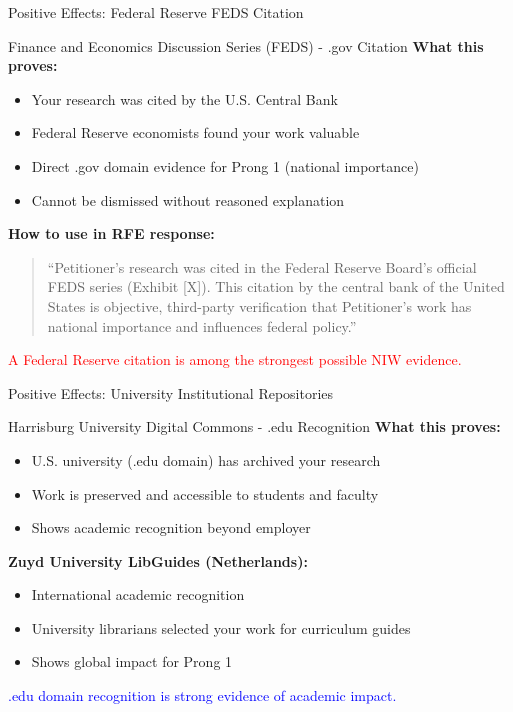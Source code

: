 \documentclass[11pt]{beamer}
\begin{document}
	\begin{frame}{Positive Effects: Federal Reserve FEDS Citation}
		\scriptsize
		\begin{block}{Finance and Economics Discussion Series (FEDS) - .gov Citation}
			\textbf{What this proves:}
			\begin{itemize}
				\item Your research was cited by the U.S. Central Bank
				\item Federal Reserve economists found your work valuable
				\item Direct .gov domain evidence for Prong 1 (national importance)
				\item Cannot be dismissed without reasoned explanation
			\end{itemize}
			\textbf{How to use in RFE response:}
			\begin{quote}
				``Petitioner's research was cited in the Federal Reserve Board's official FEDS series (Exhibit [X]). This citation by the central bank of the United States is objective, third-party verification that Petitioner's work has national importance and influences federal policy.''
			\end{quote}
			\textcolor{red}{A Federal Reserve citation is among the strongest possible NIW evidence.}
		\end{block}
	\end{frame}
	
	\begin{frame}{Positive Effects: University Institutional Repositories}
		\scriptsize
		\begin{block}{Harrisburg University Digital Commons - .edu Recognition}
			\textbf{What this proves:}
			\begin{itemize}
				\item U.S. university (.edu domain) has archived your research
				\item Work is preserved and accessible to students and faculty
				\item Shows academic recognition beyond employer
			\end{itemize}
			\textbf{Zuyd University LibGuides (Netherlands):}
			\begin{itemize}
				\item International academic recognition
				\item University librarians selected your work for curriculum guides
				\item Shows global impact for Prong 1
			\end{itemize}
			\textcolor{blue}{.edu domain recognition is strong evidence of academic impact.}
		\end{block}
	\end{frame}
	
\end{document}
